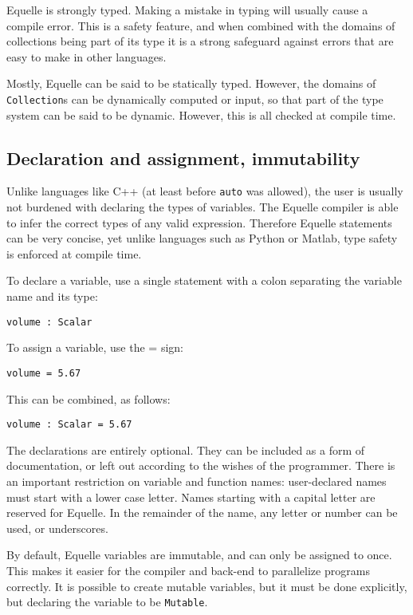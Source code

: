 \documentclass[11pt]{article}
\newcommand{\code}[1]{\texttt{#1}}
\begin{document}
Equelle is strongly typed. Making a mistake in typing will usually cause a compile
error. This is a safety feature, and when combined with the domains of collections being
part of its type it is a strong safeguard against errors that are easy to make in other
languages.

Mostly, Equelle can be said to be statically typed. However, the domains of
\code{Collection}s can be dynamically computed or input, so that part of the type system
can be said to be dynamic. However, this is all checked at compile time.

\subsection{Declaration and assignment, immutability}

Unlike languages like C++ (at least before \code{auto} was allowed), the user is usually
not burdened with declaring the types of variables. The Equelle compiler is able to infer
the correct types of any valid expression. Therefore Equelle statements can be very
concise, yet unlike languages such as Python or Matlab, type safety is enforced at compile
time.

To declare a variable, use a single statement with a colon separating the variable name
and its type:

\code{volume : Scalar}

To assign a variable, use the = sign:

\code{volume = 5.67}

This can be combined, as follows:

\code{volume : Scalar = 5.67}

The declarations are entirely optional. They can be included as a form of documentation,
or left out according to the wishes of the programmer. There is an important restriction
on variable and function names: user-declared names must start with a lower case
letter. Names starting with a capital letter are reserved for Equelle. In the remainder of
the name, any letter or number can be used, or underscores.

By default, Equelle variables are immutable, and can only be assigned to once. This makes
it easier for the compiler and back-end to parallelize programs correctly. It is possible
to create mutable variables, but it must be done explicitly, but declaring the variable to
be \code{Mutable}.



\end{document}
